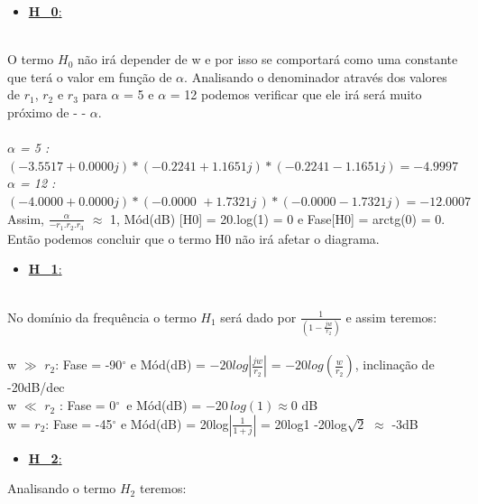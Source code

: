 \documentclass[a4paper,12pt,twoside]{article}
\begin{document}
\begin{itemize}
    \item  \underline{\large{\textbf{H_{0}}}:}
\end{itemize}\\
O termo $H_{0}$ não irá depender de w e por isso se comportará como uma constante que terá o valor em função de $\alpha$. Analisando o denominador através dos valores de $r_{1}$, $r_{2}$ e $r_{3}$ para $\alpha$ = 5 e $\alpha$ = 12 podemos verificar que ele irá será muito próximo de - - $\alpha$.\\ \\
\textit{ {\small
$\alpha$ = 5 : $(-3.5517 + 0.0000j)*(-0.2241 + 1.1651j)*(-0.2241 - 1.1651j) = -4.9997$\\
$\alpha$ = 12 : $(-4.0000 + 0.0000j)*(-0.0000\,\,+ 1.7321j\,)*(-0.0000 - 1.7321j) = -12.0007$ }}\\
Assim, $\frac{\alpha}{-r_{1}.r_{2}.r_{3}}$  $\approx $ 1, Mód(dB) [H0] = 20.log(1) = 0 e Fase[H0] = arctg(0) = 0. Então podemos concluir que o termo H0 não irá afetar o diagrama.
\\ 
\begin{itemize}
    \item \underline{\large{\textbf{H_{1}}}:}
\end{itemize}\\
No domínio da frequência o termo $H_{1}$ será dado por $\frac{1}{(1-\frac{jw}{r_{2}})}$ e assim teremos:
 \\
\\
w $\gg$ $r_{2}$: Fase = -90$^{\circ}$ e Mód(dB) = $-20 log\left |\frac{jw}{r_{2}} \right |$ = $-20 log(\frac{w}{r_{2}})$, inclinação de -20dB/dec \\
w $\ll$ $r_{2}$ : Fase = 0$^{\circ}$\, e Mód(dB) = $-20 \, log(1) \approx 0$ dB \,\,\,\\ 
w = $r_{2}$: Fase = -45$^{\circ}$ e Mód(dB) = 20log$|\frac{1}{1+j}|$ = 20log1 -20log$\sqrt{2}$ $\approx$ -3dB
\\
\begin{itemize}
    \item \underline{\large{\textbf{H_{2}}}:}
\end{itemize}

\noindent Analisando o termo $H_{2}$ teremos: 
\end{document}
